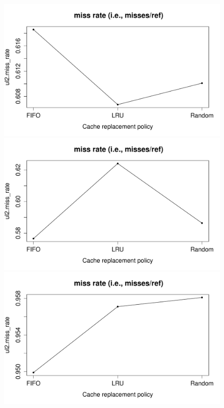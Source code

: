 \documentclass[10pt]{scrartcl}
\begin{document}
\begin{figure}[!htb]
  \includegraphics[trim={1cm 1.2cm 0 1.8cm},clip,width=\linewidth]{NewPlots/plot_RP_miss_rate}
\endminipage\hfill
{}
  \includegraphics[trim={1cm 1.2cm 0 1.8cm},clip,width=\linewidth]{NewPlots/plot_RP_A_miss_rate}
\endminipage\hfill
{}%
  \includegraphics[trim={1cm 1.2cm 0 1.8cm},clip,width=\linewidth]{NewPlots/plot_RP_C_miss_rate}

\end{figure}
\end{document}
